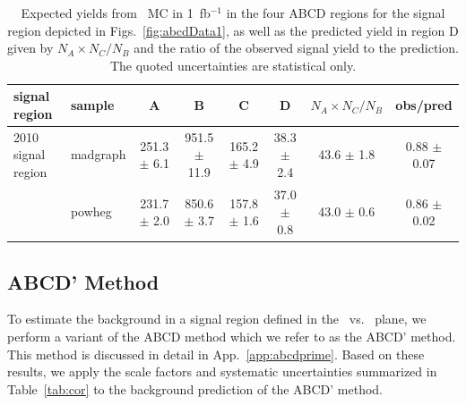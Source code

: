 \begin{table}[hbt]
\begin{center}
\caption{\label{tab:mcabcd} Expected yields from \ttbar\ MC in 1~fb$^{-1}$ in the four
ABCD regions for the signal region depicted in Figs.~\ref{fig:abcdData1},
as well as the predicted yield in region D given by $N _A \times N_C / N_B$ and the ratio of 
the observed signal yield to the prediction. The quoted uncertainties are statistical only.
}
\begin{tabular}{llccccc|c}
\hline
signal region &           sample  &                A  &                B  &                C  &                D  & $N _A \times N_C / N_B$   & obs/pred\\
\hline

\hline

2010 signal region      &   madgraph  & 251.3  $\pm$  6.1  &951.5  $\pm$  11.9  & 165.2  $\pm$  4.9  & 38.3  $\pm$  2.4  & 43.6  $\pm$  1.8  &0.88  $\pm$  0.07 \\
                        &   powheg    & 231.7  $\pm$  2.0  &850.6  $\pm$  3.7   & 157.8  $\pm$  1.6  & 37.0  $\pm$  0.8  & 43.0  $\pm$  0.6  &0.86  $\pm$  0.02 \\

%
%
%
%
\hline
\end{tabular}
\end{center}
\end{table}

\subsection{ABCD' Method}

To estimate the background in a signal region defined in the \met\ vs. \Ht\ plane, we perform
a variant of the ABCD method which we refer to as the ABCD' method. This method is discussed in detail
in App.~\ref{app:abcdprime}. 
Based on these results, we apply the scale factors and systematic uncertainties
summarized in Table~\ref{tab:cor} to the background prediction of the ABCD' method.

